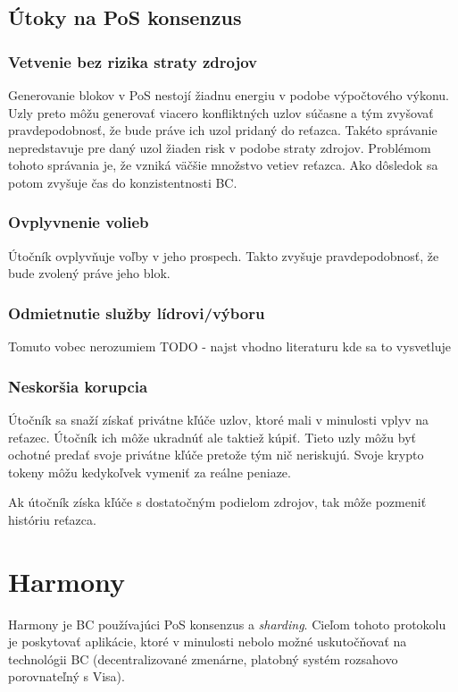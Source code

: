 \section{Útoky na PoS konsenzus}\label{sec:pos-attacks}

\subsection{Vetvenie bez rizika straty zdrojov}
Generovanie blokov v PoS nestojí žiadnu energiu v podobe výpočtového výkonu. Uzly preto môžu generovať viacero konfliktných uzlov súčasne a tým zvyšovať pravdepodobnosť, že bude práve ich uzol pridaný do reťazca. Takéto správanie nepredstavuje pre daný uzol žiaden risk v podobe straty zdrojov. Problémom tohoto správania je, že vzniká väčšie množstvo vetiev reťazca. Ako dôsledok sa potom zvyšuje čas do konzistentnosti BC.

\subsection{Ovplyvnenie volieb}
Útočník ovplyvňuje voľby v jeho prospech. Takto zvyšuje pravdepodobnosť, že bude zvolený práve jeho blok. 

\subsection{Odmietnutie služby lídrovi/výboru}

Tomuto vobec nerozumiem TODO - najst vhodno literaturu kde sa to vysvetluje

\subsection{Neskoršia korupcia}
Útočník sa snaží získať privátne kľúče uzlov, ktoré mali v minulosti vplyv na reťazec. Útočník ich môže ukradnúť ale taktiež kúpiť. Tieto uzly môžu byť ochotné predať svoje privátne kľúče pretože tým nič neriskujú. Svoje krypto tokeny môžu kedykoľvek vymeniť za reálne peniaze.

Ak útočník získa kľúče s dostatočným podielom zdrojov, tak môže pozmeniť históriu reťazca. 

\chapter{Harmony}\label{chap:harmony}

Harmony je BC používajúci PoS konsenzus a \textit{sharding}. Cieľom tohoto protokolu je poskytovať aplikácie, ktoré v minulosti nebolo možné uskutočňovať na technológii BC (decentralizované zmenárne, platobný systém rozsahovo porovnateľný s Visa).

